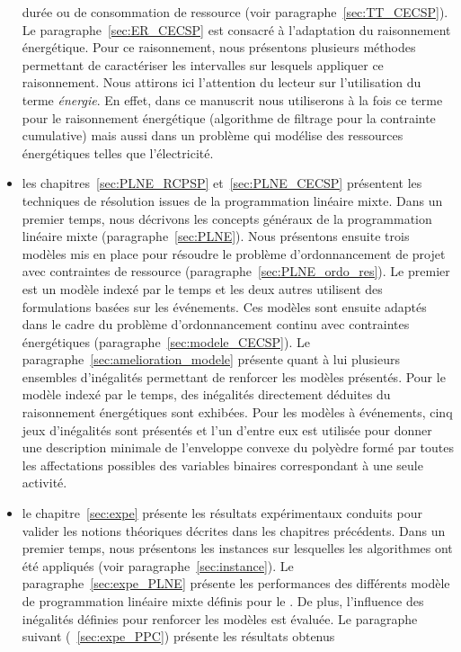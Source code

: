 \begin{itemize}
  durée ou de consommation de ressource (voir
  paragraphe~\ref{sec:TT_CECSP}). Le paragraphe~\ref{sec:ER_CECSP} est
  consacré à l'adaptation du raisonnement énergétique. Pour ce
  raisonnement, nous présentons plusieurs méthodes permettant de
  caractériser les intervalles sur lesquels appliquer ce
  raisonnement. Nous attirons ici l'attention du lecteur sur
  l'utilisation du terme {\it énergie}. En effet, dans ce manuscrit
  nous utiliserons à la fois ce terme pour le raisonnement
  énergétique (algorithme de filtrage pour la contrainte cumulative)
  mais aussi dans un problème qui modélise des ressources énergétiques
  telles que l'électricité.
\item les chapitres~\ref{sec:PLNE_RCPSP} et~\ref{sec:PLNE_CECSP}
  présentent les techniques de résolution issues de la programmation
  linéaire mixte. Dans un premier temps, nous décrivons les concepts généraux
  de la programmation linéaire mixte (paragraphe~\ref{sec:PLNE}). Nous
  présentons ensuite trois modèles mis en place pour
  résoudre le problème d'ordonnancement de projet avec contraintes de
  ressource (paragraphe~\ref{sec:PLNE_ordo_res}). Le premier est un
  modèle indexé par le temps et les deux autres utilisent des
  formulations basées sur les événements. Ces modèles sont
  ensuite adaptés dans le cadre du problème d'ordonnancement continu
avec contraintes énergétiques (paragraphe~\ref{sec:modele_CECSP}). Le
paragraphe~\ref{sec:amelioration_modele} présente quant à lui plusieurs
ensembles d'inégalités permettant de renforcer les modèles
présentés. Pour le modèle indexé par le temps, des inégalités
directement déduites du raisonnement énergétiques sont exhibées. Pour
les modèles à événements, cinq jeux d'inégalités sont présentés et
l'un d'entre eux est utilisée pour donner une description minimale de
l'enveloppe convexe du polyèdre formé par toutes les affectations
possibles des variables binaires correspondant à une seule activité.
\item le chapitre~\ref{sec:expe} présente les résultats expérimentaux
  conduits pour valider les notions théoriques décrites dans les
  chapitres précédents. Dans un premier temps, nous présentons les
  instances sur lesquelles les algorithmes ont été appliqués (voir
  paragraphe~\ref{sec:instance}). Le paragraphe~\ref{sec:expe_PLNE}
  présente les performances des différents modèle de programmation
  linéaire mixte définis pour le \CECSP. De plus, l'influence des 
  inégalités définies pour renforcer les modèles est évaluée. Le
  paragraphe suivant (~\ref{sec:expe_PPC}) présente les résultats obtenus

\end{itemize}

